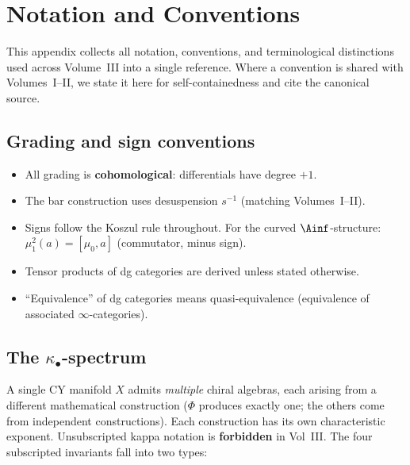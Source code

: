 \chapter{Notation and Conventions}
\label{app:notation-conventions}

This appendix collects all notation, conventions, and terminological
distinctions used across Volume~III into a single reference. Where a
convention is shared with Volumes~I--II, we state it here for
self-containedness and cite the canonical source.

\section{Grading and sign conventions}
\label{sec:nc-grading}

\begin{itemize}[nosep]
\item All grading is \textbf{cohomological}: differentials have degree $+1$.
\item The bar construction uses desuspension $s^{-1}$
 (matching Volumes~I--II).
\item Signs follow the Koszul rule throughout. For the curved
 $\Ainf$-structure: $\mu_1^2(a) = [\mu_0, a]$ (commutator, minus sign).
\item Tensor products of dg categories are derived unless stated otherwise.
\item ``Equivalence'' of dg categories means quasi-equivalence
 (equivalence of associated $\infty$-categories).
\end{itemize}

\section{The \texorpdfstring{$\kappa_\bullet$}{kappa-bullet}-spectrum}
\label{sec:nc-kappa}

A single CY manifold $X$ admits \emph{multiple} chiral algebras, each
arising from a different mathematical construction ($\Phi$
produces exactly one; the others come from independent constructions).
Each construction has its own characteristic exponent.
Unsubscripted kappa notation is \textbf{forbidden} in Vol~III.
The four subscripted invariants fall into two types:

